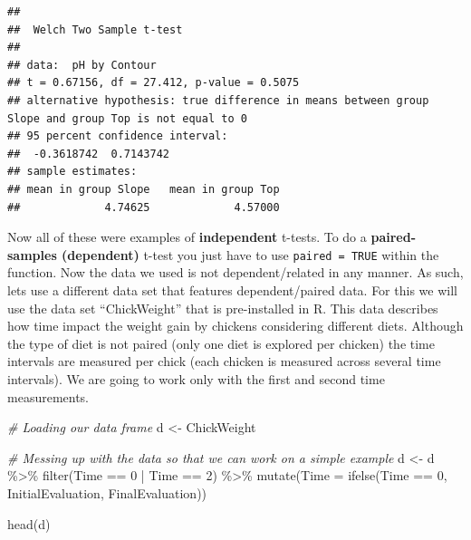 \documentclass[
]{book}
\newenvironment{Shaded}{\begin{snugshade}}{\end{snugshade}}
\newcommand{\AttributeTok}[1]{\textcolor[rgb]{0.77,0.63,0.00}{#1}}
\newcommand{\CommentTok}[1]{\textcolor[rgb]{0.56,0.35,0.01}{\textit{#1}}}
\newcommand{\DecValTok}[1]{\textcolor[rgb]{0.00,0.00,0.81}{#1}}
\newcommand{\FunctionTok}[1]{\textcolor[rgb]{0.00,0.00,0.00}{#1}}
\newcommand{\NormalTok}[1]{#1}
\newcommand{\OtherTok}[1]{\textcolor[rgb]{0.56,0.35,0.01}{#1}}
\newcommand{\SpecialCharTok}[1]{\textcolor[rgb]{0.00,0.00,0.00}{#1}}
\newcommand{\StringTok}[1]{\textcolor[rgb]{0.31,0.60,0.02}{#1}}
\begin{document}
\begin{Shaded}
\end{Shaded}

\begin{verbatim}
## 
##  Welch Two Sample t-test
## 
## data:  pH by Contour
## t = 0.67156, df = 27.412, p-value = 0.5075
## alternative hypothesis: true difference in means between group Slope and group Top is not equal to 0
## 95 percent confidence interval:
##  -0.3618742  0.7143742
## sample estimates:
## mean in group Slope   mean in group Top 
##             4.74625             4.57000
\end{verbatim}

Now all of these were examples of \textbf{independent} t-tests. To do a \textbf{paired-samples (dependent)} t-test you just have to use \texttt{paired\ =\ TRUE} within the function.
Now the data we used is not dependent/related in any manner. As such, lets use a different data set that features dependent/paired data. For this we will use the data set ``ChickWeight'' that is pre-installed in R. This data describes how time impact the weight gain by chickens considering different diets. Although the type of diet is not paired (only one diet is explored per chicken) the time intervals are measured per chick (each chicken is measured across several time intervals). We are going to work only with the first and second time measurements.

\begin{Shaded}
\begin{Highlighting}[]
\CommentTok{\# Loading our data frame}
\NormalTok{d }\OtherTok{\textless{}{-}}\NormalTok{ ChickWeight}

\CommentTok{\# Messing up with the data so that we can work on a simple example}
\NormalTok{d }\OtherTok{\textless{}{-}}\NormalTok{ d }\SpecialCharTok{\%\textgreater{}\%} 
  \FunctionTok{filter}\NormalTok{(Time }\SpecialCharTok{==} \DecValTok{0} \SpecialCharTok{|}\NormalTok{ Time }\SpecialCharTok{==} \DecValTok{2}\NormalTok{) }\SpecialCharTok{\%\textgreater{}\%} 
  \FunctionTok{mutate}\NormalTok{(}\AttributeTok{Time =} \FunctionTok{ifelse}\NormalTok{(Time }\SpecialCharTok{==} \DecValTok{0}\NormalTok{, }\StringTok{\textquotesingle{}InitialEvaluation\textquotesingle{}}\NormalTok{, }\StringTok{\textquotesingle{}FinalEvaluation\textquotesingle{}}\NormalTok{)) }

\FunctionTok{head}\NormalTok{(d)}
\end{Highlighting}
\end{Shaded}
\end{document}
